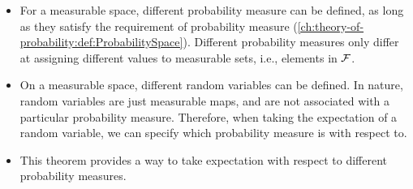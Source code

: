 \begin{refsection}
\begin{remark}\hfill
	\begin{itemize}
		\item For a measurable space, different probability measure can be defined, as long as they satisfy the requirement of probability measure (\autoref{ch:theory-of-probability:def:ProbabilitySpace}). Different probability measures only differ at assigning different values to measurable sets, i.e., elements in $\mathcal{F}$.
		\item On a measurable space, different random variables can be defined. In nature, random variables are just measurable maps, and are not associated with a particular probability measure. Therefore, when taking the expectation of a random variable, we can specify which probability measure is with respect to.
		\item This theorem provides a way to take expectation with respect to different probability measures.
	\end{itemize}
\end{remark}






\end{refsection}
